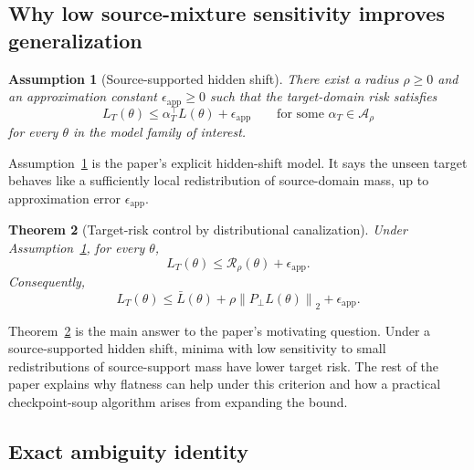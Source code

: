 \documentclass{article}
\newtheorem{theorem}{Theorem}[section]
\newtheorem{assumption}[theorem]{Assumption}
\theoremstyle{definition}
\newcommand{\cA}{\mathcal{A}}
\newcommand{\norm}[1]{\left\lVert #1 \right\rVert}
\begin{document}
\subsection{Why low source-mixture sensitivity improves generalization}

\begin{assumption}[Source-supported hidden shift]
\label{ass:source_supported}
There exist a radius \(\rho\ge 0\) and an approximation constant \(\epsilon_{\mathrm{app}}\ge 0\) such that the target-domain risk satisfies
\begin{equation}
L_T(\theta)
\le
\alpha_T^\top L(\theta) + \epsilon_{\mathrm{app}}
\qquad
\text{for some } \alpha_T \in \cA_\rho
\label{eq:source_supported}
\end{equation}
for every \(\theta\) in the model family of interest.
\end{assumption}

Assumption~\ref{ass:source_supported} is the paper's explicit hidden-shift model. It says the unseen target behaves like a sufficiently local redistribution of source-domain mass, up to approximation error \(\epsilon_{\mathrm{app}}\).

\begin{theorem}[Target-risk control by distributional canalization]
\label{thm:target_control}
Under Assumption~\ref{ass:source_supported}, for every \(\theta\),
\begin{equation}
L_T(\theta)
\le
\mathcal R_\rho(\theta)+\epsilon_{\mathrm{app}}.
\label{eq:target_control_abstract}
\end{equation}
Consequently,
\begin{equation}
L_T(\theta)
\le
\bar L(\theta)+\rho \norm{P_\perp L(\theta)}_2+\epsilon_{\mathrm{app}}.
\label{eq:target_control_explicit}
\end{equation}
\end{theorem}

Theorem~\ref{thm:target_control} is the main answer to the paper's motivating question. Under a source-supported hidden shift, minima with low sensitivity to small redistributions of source-support mass have lower target risk. The rest of the paper explains why flatness can help under this criterion and how a practical checkpoint-soup algorithm arises from expanding the bound.

\subsection{Exact ambiguity identity}
\end{document}
